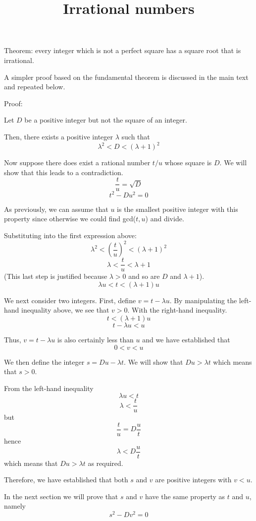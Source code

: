 \documentclass[11pt, oneside]{article}
\title{Irrational numbers}
\date{}
\begin{document}
\maketitle
\Large

\label{sec:general_irrationality}

Theorem:  every integer which is not a perfect square has a square root that is irrational.

A simpler proof based on the fundamental theorem is discussed in the main text and repeated below.

Proof:

Let $D$ be a positive integer but not the square of an integer.

Then, there exists a positive integer $\lambda$ such that
\[ \lambda^2 < D < (\lambda + 1)^2 \]

Now suppose there does exist a rational number $t/u$ whose square is $D$.  We will show that this leads to a contradiction.
\[ \frac{t}{u} = \sqrt{D} \]
\[ t^2 - Du^2 = 0 \]

As previously, we can assume that $u$ is the smallest positive integer with this property since otherwise we could find gcd($t,u$) and divide.

Substituting into the first expression above:
\[ \lambda^2 < (\frac{t}{u})^2 < (\lambda + 1)^2 \]
\[ \lambda < \frac{t}{u} < \lambda + 1 \]
(This last step is justified because $\lambda > 0$ and so are $D$ and $\lambda + 1$).
\[ \lambda u < t < (\lambda + 1)u \]

We next consider two integers.  First, define $v = t - \lambda u$.  By manipulating the left-hand inequality above, we see that $v > 0$.  With the right-hand inequality.
\[ t < (\lambda + 1)u \]
\[ t - \lambda u < u \]

Thus, $v = t - \lambda u$ is also certainly less than $u$ and we have established that
\[ 0 < v < u \]

We then define the integer $s = Du - \lambda t$.  We will show that $Du > \lambda t$ which means that $s > 0$.

From the left-hand inequality
\[ \lambda u < t \]
\[ \lambda < \frac{t}{u} \]
but 
\[ \frac{t}{u} = D \frac{u}{t}  \]
hence
\[ \lambda < D \frac{u}{t} \]
which means that $Du > \lambda t$ as required.

Therefore, we have established that both $s$ and $v$ are positive integers with $v < u$.  

In the next section we will prove that $s$ and $v$ have the same property as $t$ and $u$, namely
\[ s^2 - Dv^2 = 0 \]
\end{document}
